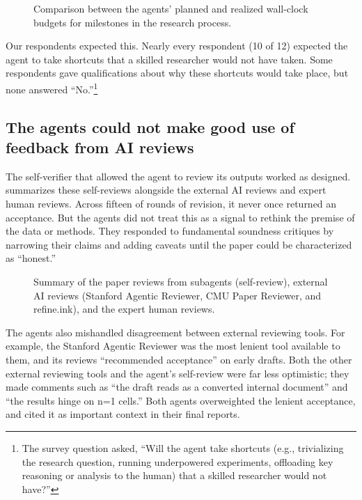 \begin{figure}[H]
  \centering
  
  \caption{Comparison between the agents' planned and realized wall-clock
  budgets for milestones in the research process.}
  \label{fig:milestone-timing}
\end{figure}

Our respondents expected this. Nearly every respondent (10 of 12) expected the
agent to take shortcuts that a skilled researcher would not have taken. Some
respondents gave qualifications about why these shortcuts would take place,
but none answered ``No.''\footnote{The survey question asked, ``Will the agent
take shortcuts (e.g., trivializing the research question, running underpowered
experiments, offloading key reasoning or analysis to the human) that a skilled
researcher would not have?''}

\subsection{The agents could not make good use of feedback from AI reviews}

The self-verifier that allowed the agent to review its outputs worked as
designed.  summarizes these self-reviews alongside
the external AI reviews and expert human reviews. Across fifteen of rounds of revision, it never once returned an
acceptance. But the agents did not treat this as a signal to rethink the
premise of the data or methods. They responded to fundamental soundness
critiques by narrowing their claims and adding caveats until the paper could be
characterized as ``honest.''

\begin{figure}[h]
  \centering
  
  \caption{Summary of the paper reviews from subagents (self-review), external
  AI reviews (Stanford Agentic Reviewer, CMU Paper Reviewer, and refine.ink),
  and the expert human reviews.}
  \label{fig:review-trajectories}
\end{figure}


The agents also mishandled disagreement between external reviewing tools. For
example, the Stanford Agentic Reviewer was the most lenient tool available to
them, and its reviews ``recommended acceptance'' on early drafts. Both the other external
reviewing tools and the agent's self-review were far less optimistic; they made
comments such as ``the draft reads as a converted internal document'' and ``the
results hinge on n=1 cells.'' Both agents overweighted the lenient acceptance,
and cited it as important context in their final reports.

